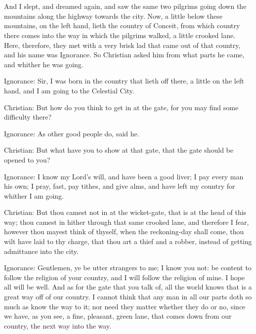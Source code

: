 \chapter[THE NINTH STAGE]{}

And I slept, and dreamed again, and saw the same two pilgrims going down the mountains along the highway towards the city. Now, a little below these mountains, on the left hand, lieth the country of Conceit, from which country there comes into the way in which the pilgrims walked, a little crooked lane. Here, therefore, they met with a very brisk lad that came out of that country, and his name was Ignorance. So Christian asked him from what parts he came, and whither he was going.

Ignorance: Sir, I was born in the country that lieth off there, a little on the left hand, and I am going to the Celestial City.

Christian: But how do you think to get in at the gate, for you may find some difficulty there?

Ignorance: As other good people do, said he.

Christian: But what have you to show at that gate, that the gate should be opened to you?

Ignorance: I know my Lord's will, and have been a good liver; I pay every man his own; I pray, fast, pay tithes, and give alms, and have left my country for whither I am going.

Christian: But thou camest not in at the wicket-gate, that is at the head of this way; thou camest in hither through that same crooked lane, and therefore I fear, however thou mayest think of thyself, when the reckoning-day shall come, thou wilt have laid to thy charge, that thou art a thief and a robber, instead of getting admittance into the city.

Ignorance: Gentlemen, ye be utter strangers to me; I know you not: be content to follow the religion of your country, and I will follow the religion of mine. I hope all will be well. And as for the gate that you talk of, all the world knows that is a great way off of our country. I cannot think that any man in all our parts doth so much as know the way to it; nor need they matter whether they do or no, since we have, as you see, a fine, pleasant, green lane, that comes down from our country, the next way into the way.

